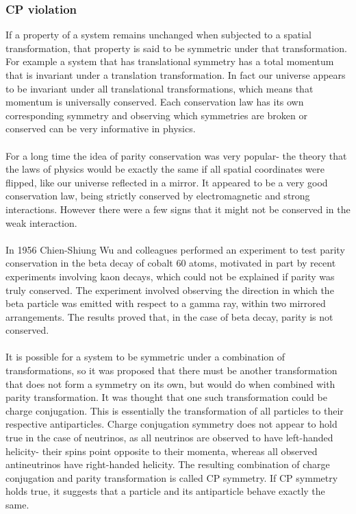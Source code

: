 \documentclass[12pt]{article}
\begin{document}
\subsubsection{CP violation}
If a property of a system remains unchanged when subjected to a spatial transformation, that property is said to be symmetric under that transformation. For example a system that has translational symmetry has a total momentum that is invariant under a translation transformation. In fact our universe appears to be invariant under all translational transformations, which means that momentum is universally conserved. Each conservation law has its own corresponding symmetry and observing which symmetries are broken or conserved can be very informative in physics.\\\\
For a long time the idea of parity conservation was very popular- the theory that the laws of physics would be exactly the same if all spatial coordinates were flipped, like our universe reflected in a mirror. It appeared to be a very good conservation law, being strictly conserved by electromagnetic and strong interactions. However there were a few signs that it might not be conserved in the weak interaction.\\\\
In 1956 Chien-Shiung Wu and colleagues performed an experiment to test parity conservation in the beta decay of cobalt 60 atoms, motivated in part by recent experiments involving kaon decays, which could not be explained if parity was truly conserved. The experiment involved observing the direction in which the beta particle was emitted with respect to a gamma ray, within two mirrored arrangements. The results proved that, in the case of beta decay, parity is not conserved\cite{Wu}.\\\\
It is possible for a system to be symmetric under a combination of transformations, so it was proposed that there must be another transformation that does not form a symmetry on its own, but would do when combined with parity transformation. It was thought that one such transformation could be charge conjugation. This is essentially the transformation of all particles to their respective antiparticles. Charge conjugation symmetry does not appear to hold true in the case of neutrinos, as all neutrinos are observed to have left-handed helicity- their spins point opposite to their momenta, whereas all observed antineutrinos have right-handed helicity. The resulting combination of charge conjugation and parity transformation is called CP symmetry. If CP symmetry holds true, it suggests that a particle and its antiparticle behave exactly the same.\\\\
\end{document}

